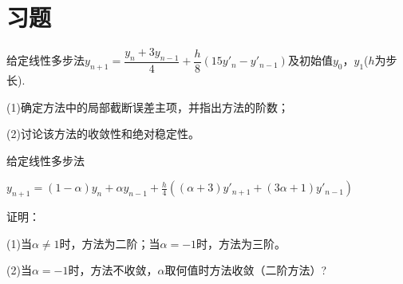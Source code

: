 \documentclass[lang=cn,newtx,12pt,scheme=chinese]{elegantbook}
\begin{document}
\section{习题}
\begin{exercise}
	给定线性多步法$y_{n+1}=\dfrac{y_n+3y_{n-1}}{4}+\dfrac{h}{8}(15y'_n-y'_{n-1})$及初始值$y_0$，$y_1$($h$为步长).
	
	(1)确定方法中的局部截断误差主项，并指出方法的阶数；
	
	(2)讨论该方法的收敛性和绝对稳定性。
\end{exercise}
\begin{exercise}
	给定线性多步法
	
	$y_{n+1} =(1-\alpha)y_n+\alpha y_{n-1}+\frac{h}{4}((\alpha+3)y'_{n+1}+(3\alpha+1)y'_{n-1})$
	
	证明：
	
	(1)当$\alpha\neq1$时，方法为二阶；当$\alpha=-1$时，方法为三阶。
	
	(2)当$\alpha=-1$时，方法不收敛，$\alpha$取何值时方法收敛（二阶方法）?
\end{exercise}
\end{document}
